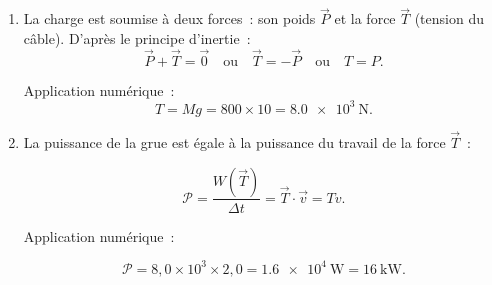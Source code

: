 \begin{enumerate}
    \item La charge est soumise à deux forces~: son poids $\vec{P}$ et la force
          $\vec{T}$ (tension du câble). D'après le principe d'inertie~:
          \[
              \vec{P}+\vec{T}=\vec{0}
              \quad\text{ou}\quad
              \vec{T}=-\vec{P}
              \quad\text{ou}\quad
              T=P.
          \]

          Application numérique~:
          \[
              T=Mg=800\times10=\qty{8.0e3}{\N}.
          \]
    
    \item La puissance de la grue est égale à la puissance du travail de la
          force $\vec{T}$~:
    
          \[
              \mathcal{P}=\frac{W(\vec{T})}{\Delta t}=\vec{T}\cdot \vec{v}=Tv.
          \]
    
    
          Application numérique~:
    
          \[
              \mathcal{P}=8,0\times10^3\times2,0=\qty{1.6e4}{\W}=\qty{16}{\kW}.
          \]
\end{enumerate}

